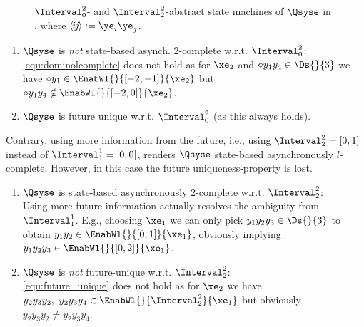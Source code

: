 \begin{figure}
\begin{center}
   \end{center}
  \caption{$\Interval^2_0$- and $\Interval^2_2$-abstract state machines of $\Qsyse$ in , where $\langle\kern-1pt{i}\kern-1pt{j}\kern-1pt\rangle:=\ye_i\ye_j$.}\label{fig:exp_Qsysa2}
 \end{figure}

 \begin{enumerate}[(C1)]
\item $\Qsyse$ is \emph{not} state-based asynch. $2$-complete w.r.t. $\Interval^2_0$:\\
\eqref{equ:dominolcomplete} does not hold as for $\xe_2$ and $\diamond y_1y_4\in\Ds{}{3}$ we have $\diamond y_1\in\EnabWl{}{[-2,-1]}{\xe_2}$ but $\diamond y_1y_4\notin\EnabWl{}{[-2,0]}{\xe_2}$. \item $\Qsyse$ is future unique w.r.t. $\Interval^2_0$ (as this always holds). 
\end{enumerate}

\noindent Contrary, using more information from the future, i.e., using $\Interval^2_2=[0,1]$ instead of $\Interval^1_1=[0,0]$, renders $\Qsyse$ state-based asynchronously $l$-complete. However, in this case the future uniqueness-property is lost.

 \begin{enumerate}[(D1)]
\item $\Qsyse$ is state-based asynchronously $2$-complete w.r.t. $\Interval^2_2$:\\
 Using more future information actually resolves the ambiguity from $\Interval^1_1$. E.g., choosing $\xe_1$ we can only pick $y_1y_2y_3\in\Ds{}{3}$ to obtain $y_1y_2\in\EnabWl{}{[0,1]}{\xe_1}$, obviously implying $y_1y_2y_3\in\EnabWl{}{[0,2]}{\xe_1}$.
\item $\Qsyse$ is \emph{not} future-unique w.r.t. $\Interval^2_2$:\\
\eqref{equ:future_unique} does not hold as for $\xe_2$ we have $y_2y_3y_2,~y_2y_3y_4\in\EnabWl{}{\Interval^2_2}{\xe_1}$ but obviously $y_2y_3y_2\neq y_2y_3y_4$. 
\end{enumerate}

